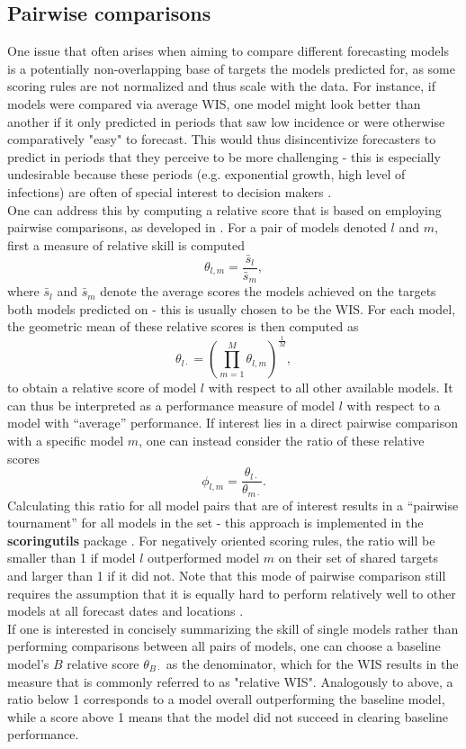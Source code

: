 \subsection{Pairwise comparisons}
One issue that often arises when aiming to compare different forecasting models is a potentially non-overlapping base of targets the models predicted for, as some scoring rules are not normalized and thus scale with the data. For instance, if models were compared via average WIS, one model might look better than another if it only predicted in periods that saw low incidence or were otherwise comparatively "easy" to forecast. This would thus disincentivize forecasters to predict in periods that they perceive to be more challenging - this is especially undesirable because these periods (e.g. exponential growth, high level of infections) are often of special interest to decision makers .\\
One can address this by computing a relative score that is based on employing pairwise comparisons, as developed in \cite{cramer_evaluation_nodate}. For a pair of models denoted $l$ and $m$, first a measure of relative skill is computed
\[
\theta_{l,m} = \frac{\bar{s}_{l}}{\bar{s}_{m}},
\]
where $\bar{s}_{l}$ and $\bar{s}_{m}$ denote the average scores the models achieved on the targets both models predicted on - this is usually chosen to be the WIS. For each model, the geometric mean of these relative scores is then computed as
\[
\theta_{l\cdot} = \left(\prod_{m = 1}^{M}\theta_{l,m} \right)^{\frac{1}{M}},
\]to obtain a relative score of model $l$ with respect to all other available models. It can thus be interpreted as a performance measure of model $l$ with respect to a model with ``average'' performance. If interest lies in a direct pairwise comparison with a specific model $m$, one can instead consider the ratio of these relative scores
\[
\phi_{l,m} = \frac{\theta_{l\cdot}}{\theta_{m\cdot}}.
\]
Calculating this ratio for all model pairs that are of interest results in a ``pairwise tournament'' for all models in the set - this approach is implemented in the \textbf{scoringutils} package \citep{bosse_epiforecastsscoringutils_2022}. For negatively oriented scoring rules, the ratio will be smaller than 1 if model $l$ outperformed model $m$ on their set of shared targets and larger than 1 if it did not. Note that this mode of pairwise comparison still requires the assumption that it is equally hard to perform relatively well to other models at all forecast dates and locations \citep{cramer_evaluation_nodate}.\\
If one is interested in concisely summarizing the skill of single models rather than performing comparisons between all pairs of models, one can choose a baseline model's $B$ relative score $\theta_{B\cdot}$ as the denominator, which for the WIS results in the measure that is commonly referred to as "relative WIS". Analogously to above, a ratio below 1 corresponds to a model overall outperforming the baseline model, while a score above 1 means that the model did not succeed in clearing baseline performance.\\

